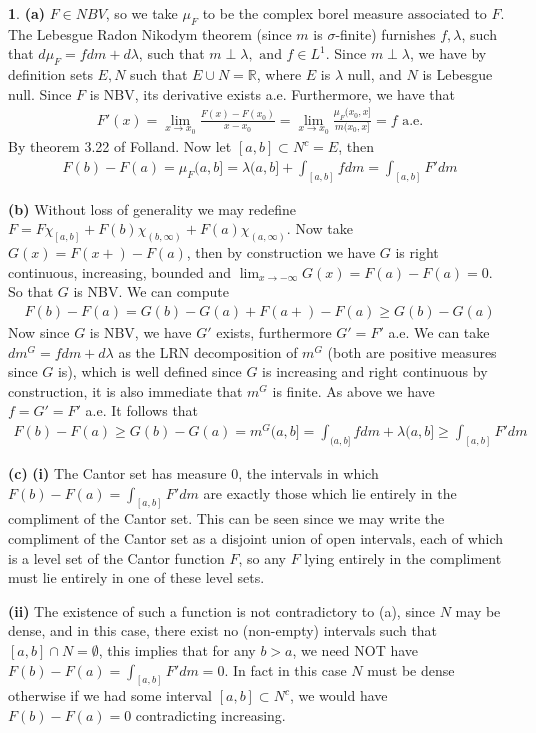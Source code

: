 \documentclass[10.5pt]{article}
\theoremstyle{definition}
\newtheorem{pb}{}
\newcommand{\tand}{\text{ and }}
\begin{document}
    \begin{pb}
        \textbf{(a)} \(F \in NBV\), so we take \(\mu_F\) to be the complex borel measure associated to \(F\). The Lebesgue Radon Nikodym theorem (since \(m\) is \(\sigma\)-finite) furnishes \(f, \lambda\), such that \(d\mu_F = fdm + d \lambda\), such that \(m \perp \lambda, \tand f \in L^1\). Since \(m \perp \lambda\), we have by definition sets \(E,N\) such that \(E \cup N = \mathbb{R}\), where \(E\) is \(\lambda\) null, and \(N\) is Lebesgue null. Since \(F\) is NBV, its derivative exists a.e. Furthermore, we have that
        \begin{align*}
            F'(x) = \lim_{x \to x_0}\frac{F(x) - F(x_0)}{x-x_0} = \lim_{x \to x_0} \frac{\mu_F(x_0,x]}{m(x_0,x]} = f \text{ a.e.}
        \end{align*}
        By theorem 3.22 of Folland. Now let \([a,b] \subset N^c = E\), then
        \begin{align*}
             F(b) - F(a) = \mu_F (a,b] = \lambda(a,b] + \int_{[a,b]}fdm = \int_{[a,b]}F' dm
        \end{align*}

        \textbf{(b)}
        Without loss of generality we may redefine \(F = F\chi_{[a,b]} + F(b)\chi_{(b,\infty)} + F(a)\chi_{(a,\infty)}\). Now take \(G(x) = F(x+) - F(a)\), then by construction we have \(G\) is right continuous, increasing, bounded and \(\lim_{x\to-\infty}G(x) = F(a) - F(a) = 0\). So that \(G\) is NBV. We can compute
        \begin{align*}
            F(b) - F(a) = G(b) - G(a) + F(a+) - F(a) \geq G(b) - G(a)
        \end{align*}
        Now since \(G\) is NBV, we have \(G'\) exists, furthermore \(G' = F'\) a.e. We can take  \(dm^G = fdm + d\lambda\) as the LRN decomposition of \(m^G\) (both are positive measures since \(G\) is), which is well defined since \(G\) is increasing and right continuous by construction, it is also immediate that \(m^G\) is finite. As above we have \(f = G' = F'\) a.e. It follows that
        \begin{align*}
        F(b) - F(a) \geq G(b) - G(a) = m^G(a,b] = \int_{(a,b]}f dm + \lambda(a,b] \geq \int_{[a,b]}F' dm
        \end{align*}

        \textbf{(c)} \textbf{(i)} The Cantor set has measure \(0\), the intervals in which \(F(b) - F(a) = \int_{[a,b]}F'dm\) are exactly those which lie entirely in the compliment of the Cantor set. This can be seen since we may write the compliment of the Cantor set as a disjoint union of open intervals, each of which is a level set of the Cantor function \(F\), so any \(F\) lying entirely in the compliment must lie entirely in one of these level sets.

        \textbf{(ii)} The existence of such a function is not contradictory to (a), since \(N\) may be dense, and in this case, there exist no (non-empty) intervals such that \([a,b] \cap N = \emptyset\), this implies that for any \(b > a\), we need NOT have \(F(b) - F(a) = \int_{[a,b]}F' dm = 0\). In fact in this case \(N\) must be dense otherwise if we had some interval \([a,b] \subset N^c\), we would have \(F(b) - F(a) = 0\) contradicting increasing.
    \end{pb}
\end{document}
